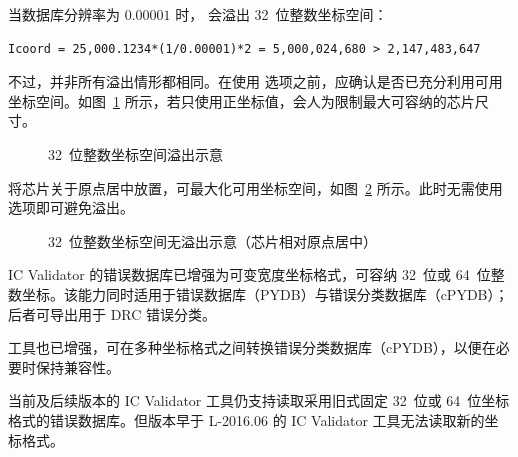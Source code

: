 当数据库分辨率为 $0.00001$ 时， 会溢出 32~位整数坐标空间：
\begin{lstlisting}
Icoord = 25,000.1234*(1/0.00001)*2 = 5,000,024,680 > 2,147,483,647
\end{lstlisting}

不过，并非所有溢出情形都相同。在使用  选项之前，应确认是否已充分利用可用坐标空间。如图~\ref{fig:icv-coord-overflow} 所示，若只使用正坐标值，会人为限制最大可容纳的芯片尺寸。

\begin{figure}[htbp]
\centering
{}
\caption{32~位整数坐标空间溢出示意}
\label{fig:icv-coord-overflow}
\end{figure}

将芯片关于原点居中放置，可最大化可用坐标空间，如图~\ref{fig:icv-coord-no-overflow} 所示。此时无需使用  选项即可避免溢出。

\begin{figure}[htbp]
\centering
{}
\caption{32~位整数坐标空间无溢出示意（芯片相对原点居中）}
\label{fig:icv-coord-no-overflow}
\end{figure}

IC Validator 的错误数据库已增强为可变宽度坐标格式，可容纳 32~位或 64~位整数坐标。该能力同时适用于错误数据库（PYDB）与错误分类数据库（cPYDB）；后者可导出用于 DRC 错误分类。

 工具也已增强，可在多种坐标格式之间转换错误分类数据库（cPYDB），以便在必要时保持兼容性。

\begin{noteBox}
当前及后续版本的 IC Validator 工具仍支持读取采用旧式固定 32~位或 64~位坐标格式的错误数据库。但版本早于 L-2016.06 的 IC Validator 工具无法读取新的坐标格式。
\end{noteBox}

